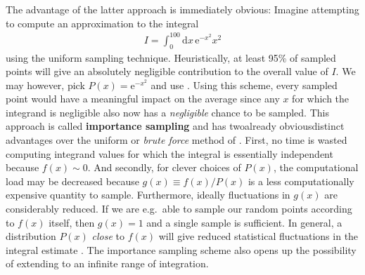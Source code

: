 \documentclass[../../master.tex]{subfiles}
\begin{document}
The advantage of the latter approach is immediately obvious: Imagine attempting to compute an approximation to the integral
\begin{align}
I=\int_0^{100}\mathrm{d}x\, \mathrm{e}^{-x^2}x^2
\end{align}
using the uniform sampling technique. Heuristically, at least 95\% of sampled points will give an absolutely negligible contribution to the overall value of $I$. We may however, pick $P(x)=\mathrm{e}^{-x^2}$ and use . Using this scheme, every sampled point would have a meaningful impact on the average since any $x$ for which the integrand is negligible also now has a \emph{negligible} chance to be sampled. This approach is called {\bf importance sampling} and has two\textemdash already obvious\textemdash distinct advantages over the uniform or \emph{brute force} method of . First, no time is wasted computing integrand values for which the integral is essentially independent because $f(x)\sim0$. And secondly, for clever choices of $P(x)$, the computational load may be decreased because $g(x)\equiv f(x)/P(x)$ is a less computationally expensive quantity to sample. Furthermore, ideally fluctuations in $g(x)$ are considerably reduced. If we are e.g.\ able to sample our random points according to $f(x)$ itself, then $g(x)=1$ and a single sample is sufficient. In general, a distribution $P(x)$ \emph{close} to $f(x)$ will give reduced statistical fluctuations in the integral estimate \cite{hammond}. The importance sampling scheme also opens up the possibility of extending to an infinite range of integration.
\end{document}
